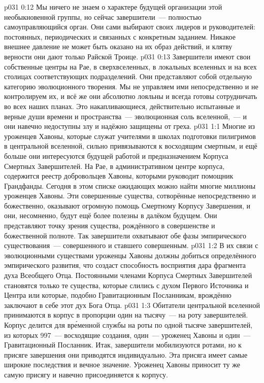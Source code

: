 \vs p031 0:12 Мы ничего не знаем о характере будущей организации этой необыкновенной группы, но сейчас завершители~--- полностью самоуправляющийся орган. Они сами выбирают своих лидеров и руководителей: постоянных, периодических и связанных с конкретным заданием. Никакое внешнее давление не может быть оказано на их образ действий, и клятву верности они дают только Райской Троице.
\vs p031 0:13 Завершители имеют свои собственные центры на Рае, в сверхвселенных, в локальных вселенных и на всех столицах соответствующих подразделений. Они представляют собой отдельную категорию эволюционного творения. Мы не управляем ими непосредственно и не контролируем их, и всё же они абсолютно лояльны и всегда готовы сотрудничать во всех наших планах. Это накапливающиеся, действительно испытанные и верные души времени и пространства~--- эволюционная соль вселенной,~--- и они навечно недоступны злу и надёжно защищены от греха.
\vs p031 1:1 Многие из уроженцев Хавоны, которые служат учителями в школах подготовки пилигримов в центральной вселенной, сильно привязываются к восходящим смертным, и ещё больше они интересуются будущей работой и предназначением Корпуса Смертных Завершителей. На Рае, в административном центре корпуса, содержится реестр добровольцев Хавоны, которыми руководит помощник Грандфанды. Сегодня в этом списке ожидающих можно найти многие миллионы уроженцев Хавоны. Эти совершенные существа, сотворённые непосредственно и божественно, оказывают огромную помощь Смертному Корпусу Завершения, и они, несомненно, будут ещё более полезны в далёком будущем. Они представляют точку зрения существа, рождённого в совершенстве и божественной полноте. Так завершители охватывают обе фазы эмпирического существования~--- совершенного и ставшего совершенным.
\vs p031 1:2 В их связи с эволюционными существами уроженцы Хавоны должны добиться определённого эмпирического развития, что создаст способность восприятия дара фрагмента духа Всеобщего Отца. Постоянными членами Корпуса Смертных Завершителей становятся только те существа, которые слились с духом Первого Источника и Центра или которые, подобно Гравитационным Посланникам, врождённо заключают в себе этот дух Бога Отца.
\vs p031 1:3 Обитатели центральной вселенной принимаются в корпус в пропорции один на тысячу~--- на роту завершителей. Корпус делится для вр\'еменной службы на роты по одной тысяче завершителей, из которых 997~--- восходящие создания, один~--- уроженец Хавоны и один~--- Гравитационный Посланник. Итак, завершители мобилизуются ротами, но к присяге завершения они приводятся индивидуально. Эта присяга имеет самые широкие последствия и вечное значение. Уроженец Хавоны приносит ту же самую присягу и навечно присоединяется к корпусу.
